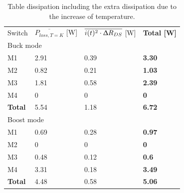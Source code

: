 \begin{table}[]
	\centering
	\begin{tabular}{|l|l|l|l|}
		\hline
		\rowcolor[HTML]{C0C0C0} 
		\multicolumn{4}{|c|}{\cellcolor[HTML]{C0C0C0}\textbf{Switches power dissipation}}                                                   \\ \hline
		\rowcolor[HTML]{C0C0C0} 
		Switch         & $\overline{P_{loss, T = K}}$ {[}W{]} & $ \overline{i(t)^2 \cdot \Updelta R_{DS}}$ {[}W{]} & \textbf{Total {[}W{]}} \\ \hline
		\multicolumn{4}{|l|}{Buck mode}                                                                                                     \\ \hline
		M1             & 2.91                                 & 0.39                                               & \textbf{3.30}          \\ \hline
		M2             & 0.82                                 & 0.21                                               & \textbf{1.03}          \\ \hline
		M3             & 1.81                                 & 0.58                                               & \textbf{2.39}          \\ \hline
		M4             & 0                                    & 0                                                  & \textbf{0}             \\ \hline
		\textbf{Total} & 5.54                                 & 1.18                                               & \textbf{6.72}          \\ \hline
		\multicolumn{4}{|l|}{Boost mode}                                                                                                    \\ \hline
		M1             & 0.69                                 & 0.28                                               & \textbf{0.97}          \\ \hline
		M2             & 0                                    & 0                                                  & \textbf{0}             \\ \hline
		M3             & 0.48                                 & 0.12                                               & \textbf{0.6}           \\ \hline
		M4             & 3.31                                 & 0.18                                               & \textbf{3.49}          \\ \hline
		\textbf{Total} & 4.48                                 & 0.58                                               & \textbf{5.06}          \\ \hline
	\end{tabular}
\caption{Table dissipation including the extra dissipation due to the increase of temperature.}
\label{mosfet_final_dissipation}
\end{table}


